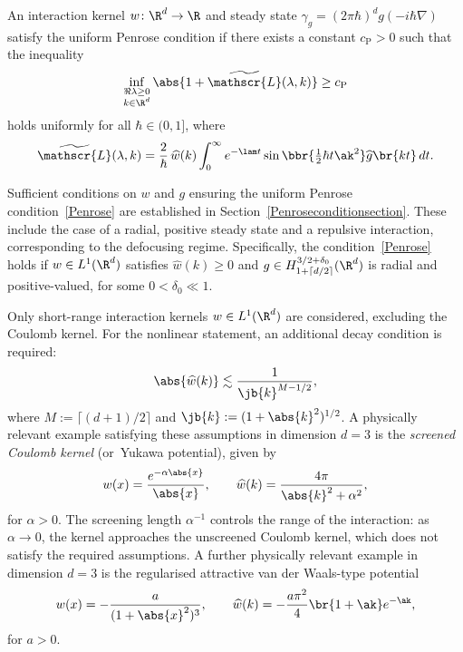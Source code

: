 \begin{definition}
An interaction kernel \(w\colon \R^d \to \R\) and steady state \(\gamma_g = (2\pi\hbar)^d g(-i\hbar\nabla)\) satisfy the uniform Penrose condition if there exists a constant \({c_{\mathrm{P}}} > 0\) such that the inequality
\begin{align}\label{Penrose}
\inf_{\substack{\Re\lambda \geq 0 \\ k \in \R^d}} \abs{1 + \widetilde{\mathscr{L}}(\lambda, k)} \geq {c_{\mathrm{P}}}
\end{align}
holds uniformly for all \(\hbar \in (0,1]\), where
\[
\widetilde{\mathscr{L}}(\lambda, k) = \frac{2}{\hbar}\, \widehat{w}(k) \int_0^\infty e^{-\lam t}\sin\bbr{\tfrac{1}{2}\hbar t \ak^2} \widehat{g}\br{kt}\,dt.
\]

\end{definition}
Sufficient conditions on $w$ and $g$ ensuring the uniform Penrose condition~\eqref{Penrose} are established in Section~\ref{Penroseconditionsection}. These include the case of a radial, positive steady state and a repulsive interaction, corresponding to the defocusing regime. Specifically, the condition~\eqref{Penrose} holds if \( w \in L^1(\R^d) \) satisfies \( \widehat{w}(k) \geq 0 \) and \( g \in H^{3/2+\delta_0}_{1+\lceil d/2 \rceil}(\R^d) \) is radial and positive-valued, for some \( 0 < \delta_0 \ll 1 \).

Only short-range interaction kernels \( w \in L^1(\R^d) \) are considered, excluding the Coulomb kernel. For the nonlinear statement, an additional decay condition is required:
\[
\abs{\widehat{w}(k)} \lesssim \frac{1}{\jb{k}^{M-1/2}},
\]
where \( M := \lceil (d+1)/2 \rceil \) and \( \jb{k} := (1 + \abs{k}^2)^{1/2} \). A physically relevant example satisfying these assumptions in dimension \( d = 3 \) is the \textit{screened Coulomb kernel} (or~Yukawa potential), given by
\[
w(x) = \frac{e^{-\alpha\abs{x}}}{\abs{x}}, \qquad \widehat{w}(k) = \frac{4\pi}{\abs{k}^2 + \alpha^2},
\]
for \( \alpha > 0 \). The screening length \( \alpha^{-1} \) controls the range of the interaction: as \( \alpha \to 0 \), the kernel approaches the unscreened Coulomb kernel, which does not satisfy the required assumptions. A further physically relevant example in dimension $d=3$ is the regularised attractive van der Waals-type potential
\[w(x)=-\frac{a}{(1+\abs{x}^2)^3},\qquad \widehat w(k)=-\frac{a\pi^2}{4}\br{1+\ak}e^{-\ak},\]
for $a>0$.


